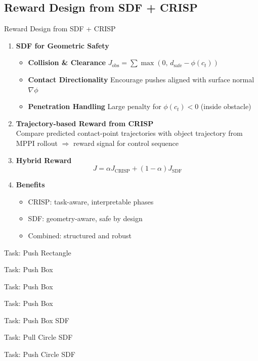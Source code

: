 \documentclass[10pt, aspectratio=169]{beamer}
\begin{document}
\subsection{Reward Design from SDF + CRISP}
\begin{frame}{Reward Design from SDF + CRISP}

  \begin{enumerate}[<+->]
    \item \textbf{SDF for Geometric Safety}  
    \begin{itemize}[<.->]      
        \item \textbf{Collision \& Clearance}  
        $J_{\text{obs}} = \sum \max(0,\, d_{\text{safe}} - \phi(c_t))$
        \item \textbf{Contact Directionality}  
        Encourage pushes aligned with surface normal $\nabla \phi$
        \item \textbf{Penetration Handling} Large penalty for $\phi(c_t) < 0$ (inside obstacle)
    \end{itemize}

    \item \textbf{Trajectory-based Reward from CRISP}\\
    Compare predicted contact-point trajectories with object trajectory from MPPI rollout $\Rightarrow$ reward signal for control sequence

    \item \textbf{Hybrid Reward}  
    \[ J = \alpha J_{\text{CRISP}} + (1-\alpha) J_{\text{SDF}} \]

    \item \textbf{Benefits}  
    \begin{itemize}[<.->]
      \item CRISP: task-aware, interpretable phases
      \item SDF: geometry-aware, safe by design
      \item Combined: structured and robust
    \end{itemize}
  \end{enumerate}
\end{frame}

\begin{frame}{Task: Push Rectangle}
\end{frame}
\begin{frame}{Task: Push Box}
\end{frame}
\begin{frame}{Task: Push Box}
\end{frame}
\begin{frame}{Task: Push Box}
\end{frame}
\begin{frame}{Task: Push Box SDF}
\end{frame}
\begin{frame}{Task: Pull Circle SDF}
\end{frame}
\begin{frame}{Task: Push Circle SDF}
\end{frame}
\end{document}
